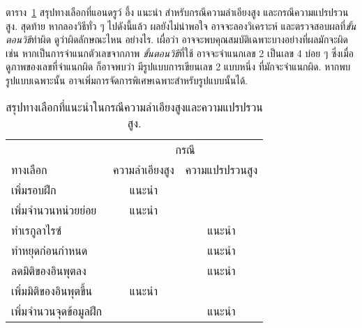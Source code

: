 ตาราง~\ref{tbl: ann tips options by bias variance} 
สรุปทางเลือกที่แอนดรูว์ อึ้ง\cite{Ng2013a}
แนะนำ
สำหรับกรณีความลำเอียงสูง
และกรณีความแปรปรวนสูง.
สุดท้าย
หากลองวิธีทั่ว ๆ ไปดังนี้แล้ว ผลยังไม่น่าพอใจ
อาจจะลองวิเคราะห์ และตรวจสอบผลที่\textit{ขั้นตอนวิธี}ทำผิด ดูว่าผิดลักษณะไหน อย่างไร.
เผื่อว่า อาจจะพบคุณสมบัติเฉพาะบางอย่างที่ผลมักจะผิด เช่น 
หากเป็นการจำแนกตัวเลขจากภาพ \textit{ขั้นตอนวิธี}ที่ใช้ อาจจะจำแนกเลข 2 เป็นเลข 4 บ่อย ๆ ซึ่งเมื่อดูภาพของเลขที่จำแนกผิด ก็อาจพบว่า มีรูปแบบการเขียนเลข 2 แบบหนึ่ง ที่มักจะจำแนกผิด.
หากพบรูปแบบเฉพาะนั้น อาจเพิ่มการจัดการพิเศษเฉพาะสำหรับรูปแบบนั้นได้.


\begin{table}[hbtp]
		\caption[สรุปคำแนะนำสำหรับปรับปรุงแบบจำลอง]{สรุปทางเลือกที่แนะนำในกรณีความลำเอียงสูงและความแปรปรวนสูง.}
		\label{tbl: ann tips options by bias variance}
		\begin{center}
			\begin{tabular}{|l|c|c|}
				\hline 
				& \multicolumn{2}{c|}{กรณี} \\
				\cline{2-3}
				ทางเลือก & ความลำเอียงสูง & ความแปรปรวนสูง \\
				\hline
				เพิ่มรอบฝึก            & แนะนำ      &   \\
				เพิ่มจำนวนหน่วยย่อย     & แนะนำ      &   \\
				ทำเรกูลาไรซ์        &           & แนะนำ \\
				ทำหยุดก่อนกำหนด    &           & แนะนำ \\
				ลดมิติของอินพุตลง       &           & แนะนำ \\
				เพิ่มมิติของอินพุตขึ้น      & แนะนำ      &  \\
				เพิ่มจำนวนจุดข้อมูลฝึก     &             & แนะนำ \\
				\hline
			\end{tabular} 
		\end{center}
\end{table}






